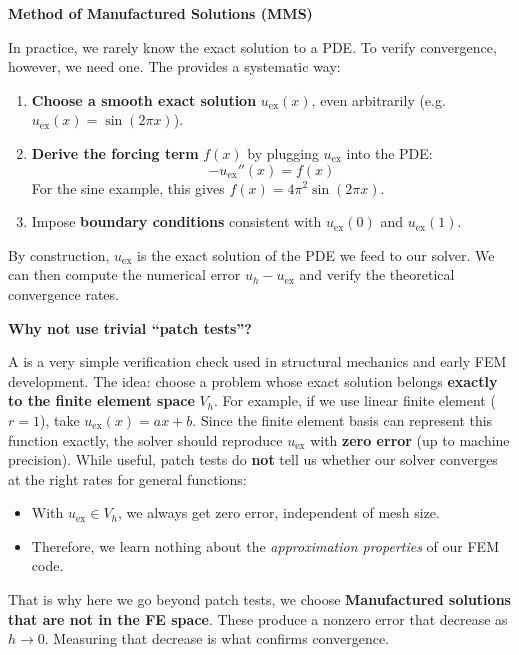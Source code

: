 \highspace
\begin{flushleft}
    \textcolor{Green3}{ \textbf{Method of Manufactured Solutions (MMS)}}
\end{flushleft}
In practice, we rarely know the exact solution to a PDE. To verify convergence, however, we need one. The  provides a systematic way:
\begin{enumerate}
    \item \textbf{Choose a smooth exact solution} $u_{\text{ex}}(x)$, even arbitrarily (e.g. $u_{\text{ex}}(x) = \sin(2\pi x)$).
    \item \textbf{Derive the forcing term} $f(x)$ by plugging $u_{\text{ex}}$ into the PDE:
    \begin{equation*}
        -u_{\text{ex}}''(x) = f(x)
    \end{equation*}
    For the sine example, this gives $f(x) = 4\pi^2\sin(2\pi x)$.
    \item Impose \textbf{boundary conditions} consistent with $u_{\text{ex}}(0)$ and $u_{\text{ex}}(1)$.
\end{enumerate}
By construction, $u_{\text{ex}}$ is the exact solution of the PDE we feed to our solver. We can then compute the numerical error $u_h - u_{\text{ex}}$ and verify the theoretical convergence rates.

\highspace
\begin{flushleft}
    \textcolor{Green3}{ \textbf{Why not use trivial ``patch tests''?}}
\end{flushleft}
A  is a very simple verification check used in structural mechanics and early FEM development. The idea: choose a problem whose exact solution belongs \textbf{exactly to the finite element space} $V_{h}$. For example, if we use linear finite element ($r=1$), take $u_{\text{ex}}(x) = a x + b$. Since the finite element basis can represent this function exactly, the solver should reproduce $u_{\text{ex}}$ with \textbf{zero error} (up to machine precision). While useful, patch tests do \textbf{not} tell us whether our solver converges at the right rates for general functions:
\begin{itemize}
    \item With $u_{\text{ex}}\in V_h$, we always get zero error, independent of mesh size.
    \item Therefore, we learn nothing about the \emph{approximation properties} of our FEM code.
\end{itemize}
That is why here we go beyond patch tests, we choose \textbf{Manufactured solutions that are not in the FE space}. These produce a nonzero error that decrease as $h \to 0$. Measuring that decrease is what confirms convergence.